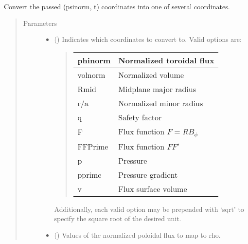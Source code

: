 \documentclass[letterpaper,10pt,english]{sphinxmanual}
\begin{document}
\begin{fulllineitems}
\begin{fulllineitems}
\label{\detokenize{eqtools:eqtools.core.Equilibrium.psinorm2rho}}
Convert the passed (psinorm, t) coordinates into one of several coordinates.
\begin{quote}\begin{description}
\item[{Parameters}] \leavevmode\begin{itemize}
\item {} 
 () \textendash{} 
Indicates which coordinates to convert to.
Valid options are:
\begin{quote}


\begin{savenotes}\sphinxattablestart
\centering
\begin{tabulary}{\linewidth}[t]{|T|T|}
\hline

phinorm
&
Normalized toroidal flux
\\
\hline
volnorm
&
Normalized volume
\\
\hline
Rmid
&
Midplane major radius
\\
\hline
r/a
&
Normalized minor radius
\\
\hline
q
&
Safety factor
\\
\hline
F
&
Flux function \(F=RB_{\phi}\)
\\
\hline
FFPrime
&
Flux function \(FF'\)
\\
\hline
p
&
Pressure
\\
\hline
pprime
&
Pressure gradient
\\
\hline
v
&
Flux surface volume
\\
\hline
\end{tabulary}
\par
\sphinxattableend\end{savenotes}
\end{quote}

Additionally, each valid option may be prepended with ‘sqrt’
to specify the square root of the desired unit.


\item {} 
 () \textendash{} Values of the normalized
poloidal flux to map to rho.


\end{itemize}
\end{description}
\end{quote}
\end{fulllineitems}
\end{fulllineitems}
\end{document}
